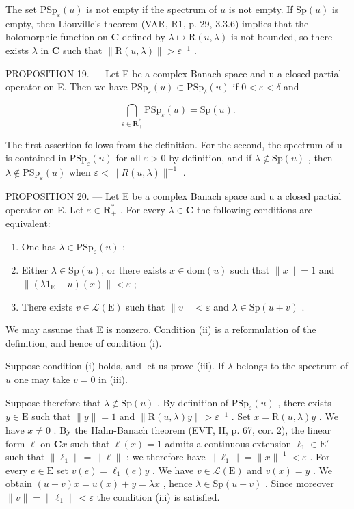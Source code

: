 The set \(\mathrm{PSp}_{\varepsilon}(u)\) is not empty if the spectrum of \(u\) is not empty. If \(\mathrm{Sp}(u)\) is empty, then Liouville's theorem (VAR, R1, p. 29, 3.3.6) implies that the holomorphic function on \(\mathbf{C}\) defined by \(\lambda \mapsto \mathrm{R}(u,\lambda)\) is not bounded, so there exists \(\lambda\) in \(\mathbf{C}\) such that \(\| \mathrm{R}(u,\lambda)\| >\varepsilon^{-1}\) .

PROPOSITION 19. --- Let E be a complex Banach space and u a closed partial operator on E. Then we have \(\mathrm{PSp}_{\varepsilon}(u) \subset \mathrm{PSp}_{\delta}(u)\) if \(0 < \varepsilon < \delta\) and

\[
\bigcap_ {\varepsilon \in \mathbf {R} _ {+} ^ {*}} \mathrm{PSp} _ {\varepsilon} (u) = \mathrm{Sp} (u).
\]

The first assertion follows from the definition. For the second, the spectrum of u is contained in \(\mathrm{PSp}_{\varepsilon}(u)\) for all \(\varepsilon > 0\) by definition, and if \(\lambda \notin \mathrm{Sp}(u)\) , then \(\lambda \notin \mathrm{PSp}_{\varepsilon}(u)\) when \(\varepsilon < \|R(u, \lambda)\|^{-1}\) .

PROPOSITION 20. --- Let E be a complex Banach space and u a closed partial operator on E. Let \(\varepsilon\in\mathbf{R}_{+}^{*}\) . For every \(\lambda\in\mathbf{C}\) the following conditions are equivalent:

\begin{enumerate}
\def\labelenumi{(\roman{enumi})}
\item
  One has \(\lambda \in \mathrm{PSp}_{\varepsilon}(u)\) ;
\item
  Either \(\lambda \in \mathrm{Sp}(u)\), or there exists \(x \in \mathrm{dom}(u)\) such that \(\| x \| = 1\) and \(\| (\lambda 1_{\mathrm{E}} - u)(x) \| < \varepsilon\) ;
\item
  There exists \(v \in \mathcal{L}(\mathrm{E})\) such that \(\| v \| < \varepsilon\) and \(\lambda \in \mathrm{Sp}(u + v)\) .
\end{enumerate}

We may assume that E is nonzero. Condition (ii) is a reformulation of the definition, and hence of condition (i).

Suppose condition (i) holds, and let us prove (iii). If \(\lambda\) belongs to the spectrum of \(u\) one may take \(v = 0\) in (iii).

Suppose therefore that \(\lambda \notin \mathrm{Sp}(u)\) . By definition of \(\mathrm{PSp}_{\varepsilon}(u)\) , there exists \(y \in \mathrm{E}\) such that \(\| y \| = 1\) and \(\| \mathrm{R}(u, \lambda)y \| > \varepsilon^{-1}\) . Set \(x = \mathrm{R}(u, \lambda)y\) . We have \(x \neq 0\) . By the Hahn-Banach theorem (EVT, II, p. 67, cor. 2), the linear form \(\ell\) on \(\mathbf{C}x\) such that \(\ell(x) = 1\) admits a continuous extension \(\ell_1 \in \mathrm{E}'\) such that \(\| \ell_1 \| = \| \ell \|\) ; we therefore have \(\| \ell_1 \| = \| x \|^{-1} < \varepsilon\) . For every \(e \in \mathrm{E}\) set \(v(e) = \ell_1(e)y\) . We have \(v \in \mathcal{L}(\mathrm{E})\) and \(v(x) = y\) . We obtain \((u + v)x = u(x) + y = \lambda x\) , hence \(\lambda \in \mathrm{Sp}(u + v)\) . Since moreover \(\| v \| = \| \ell_1 \| < \varepsilon\) the condition (iii) is satisfied.

